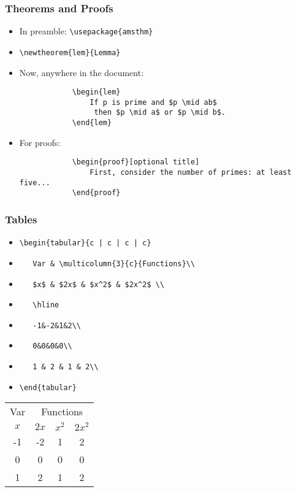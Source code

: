 \begin{frame}[fragile]
\frametitle{Theorems and Proofs}
\begin{itemize}
	\item[]<1-> In preamble: \verb|\usepackage{amsthm}|
	\item[]<1->  \hspace{12ex} \verb|\newtheorem{lem}{Lemma}|
	\item[]<2-> Now, anywhere in the document:
		\begin{verbatim}
			\begin{lem}
				If p is prime and $p \mid ab$
				 then $p \mid a$ or $p \mid b$.
			\end{lem}
		\end{verbatim}
	\item[]<3-> For proofs:
		\begin{verbatim}
			\begin{proof}[optional title]
				First, consider the number of primes: at least five...
			\end{proof}
		\end{verbatim}
\end{itemize}
\end{frame}

\begin{frame}[fragile]
\frametitle{Tables}
\begin{itemize}
	\item[]<1-> \protect\verb!\begin{tabular}{c | c | c | c}!
	\item[]<1,9-> \verb|   Var & \multicolumn{3}{c}{Functions}\\|
	\item[]<1,3-> \verb|   $x$ & $2x$ & $x^2$ & $2x^2$ \\|
	\item[]<1,4-> \verb|   \hline|
	\item[]<1,5-> \verb|   -1&-2&1&2\\|
	\item[]<1,6-> \verb|   0&0&0&0\\|
	\item[]<1,7-> \verb|   1 & 2 & 1 & 2\\|
	\item[]<1,8-> \verb|\end{tabular}|
\end{itemize}
\begin{flushright}
\begin{tabular}{c | c | c | c} 
Var & \multicolumn{3}{c}{Functions}\\ 
$x$ & $2x$ & $x^2$ & $2x^2$ \\ 
\hline 
-1&-2&1&2\\ 
0&0&0&0\\ 
1 & 2 & 1 & 2\\
\end{tabular}
\end{flushright}
\end{frame}


